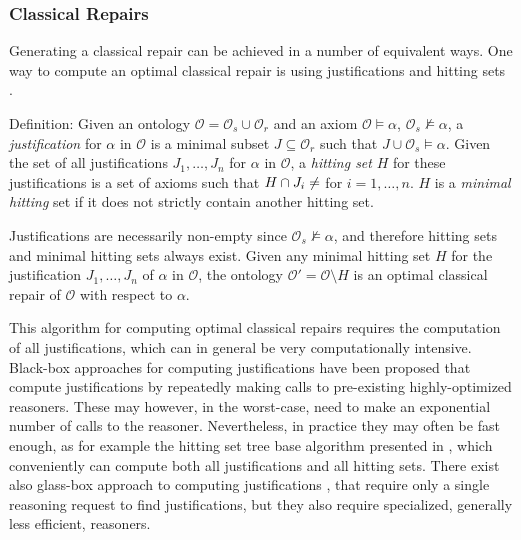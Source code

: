 \subsubsection{Classical Repairs} \label{classical-repairs}

Generating a classical repair can be achieved in a number of equivalent ways. One way to compute an optimal classical repair is using justifications and hitting sets \cite{reiter1987theory}.

Definition: Given an ontology $\mathcal{O} = \mathcal{O}_s \cup \mathcal{O}_r$ and an axiom $\mathcal{O} \vDash \alpha$, $\mathcal{O}_s \not\vDash \alpha$, a \emph{justification} for $\alpha$ in $\mathcal{O}$ is a minimal subset $J \subseteq \mathcal{O}_r$ such that $J \cup \mathcal{O}_s \vDash \alpha$. Given the set of all justifications $J_1, \dots, J_n$ for $\alpha$ in $\mathcal{O}$, a \emph{hitting set} $H$ for these justifications is a set of axioms such that $H \cap J_i \not= \empty$ for $i = 1, \dots, n$. $H$ is a \emph{minimal hitting} set if it does not strictly contain another hitting set.

\begin{example}
\end{example}

Justifications are necessarily non-empty since $\mathcal{O}_s \not\vDash \alpha$, and therefore hitting sets and minimal hitting sets always exist. Given any minimal hitting set $H$ for the justification $J_1, \dots, J_n$ of $\alpha$ in $\mathcal{O}$, the ontology $\mathcal{O}' = \mathcal{O} \setminus H$ is an optimal classical repair of $\mathcal{O}$ with respect to $\alpha$.

This algorithm for computing optimal classical repairs requires the computation of all justifications, which can in general be very computationally intensive. Black-box approaches for computing justifications have been proposed \cite{kalyanpur2007finding,schlobach2003non,schlobach2007debugging} that compute justifications by repeatedly making calls to pre-existing highly-optimized reasoners. These may however, in the worst-case, need to make an exponential number of calls to the reasoner. Nevertheless, in practice they may often be fast enough, as for example the hitting set tree base algorithm presented in \cite{kalyanpur2007finding}, which conveniently can compute both all justifications and all hitting sets. There exist also glass-box approach to computing justifications \cite{kalyanpur2007finding}, that require only a single reasoning request to find justifications, but they also require specialized, generally less efficient, reasoners.

